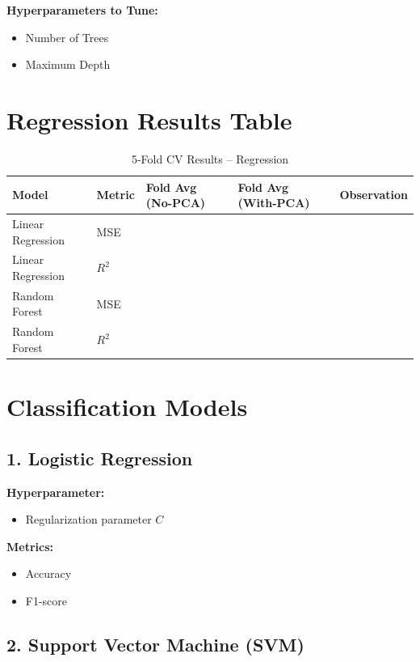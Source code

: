 \documentclass[11pt]{article}
\begin{document}
\textbf{Hyperparameters to Tune:}
\begin{itemize}
    \item Number of Trees
    \item Maximum Depth
\end{itemize}

\section*{Regression Results Table}

\begin{table}[h!]
\centering
\caption{5-Fold CV Results – Regression}
\begin{tabularx}{\textwidth}{|X|X|X|X|X|}
\hline
Model & Metric & Fold Avg (No-PCA) & Fold Avg (With-PCA) & Observation \\
\hline
Linear Regression & MSE &  &  &  \\
Linear Regression & $R^2$ &  &  &  \\
Random Forest & MSE &  &  &  \\
Random Forest & $R^2$ &  &  &  \\
\hline
\end{tabularx}
\end{table}

\section*{Classification Models}

\subsection*{1. Logistic Regression}

\textbf{Hyperparameter:}
\begin{itemize}
    \item Regularization parameter $C$
\end{itemize}

\textbf{Metrics:}
\begin{itemize}
    \item Accuracy
    \item F1-score
\end{itemize}

\subsection*{2. Support Vector Machine (SVM)}
\end{document}
